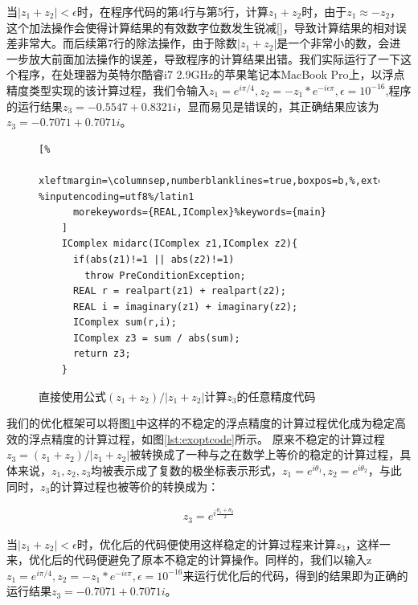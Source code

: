 当$|z_1+z_2| < \epsilon$时，在程序代码的第4行与第5行，计算$z_1+z_2$时，由于$z_1 \approx -z_2$，这个加法操作会使得计算结果的有效数字位数发生锐减[]，导致计算结果的相对误差非常大。而后续第7行的除法操作，由于除数$|z_1+z_2|$是一个非常小的数，会进一步放大前面加法操作的误差，导致程序的计算结果出错。我们实际运行了一下这个程序，在处理器为英特尔酷睿i7 2.9GHz的苹果笔记本MacBook Pro上，以浮点精度类型实现的该计算过程，我们令输入$z_1=e^{i\pi/4},z_2=-z_1*e^{-i \epsilon \pi},\epsilon=10^{-16}$,程序的运行结果$z_3=-0.5547+0.8321i$，显而易见是错误的，其正确结果应该为$z_3=-0.7071+0.7071i$。

\begin{figure}[thbp]
    \begin{lstlisting}[%
      xleftmargin=\columnsep,numberblanklines=true,boxpos=b,%,extendedchars=\true, %inputencoding=utf8%/latin1
      morekeywords={REAL,IComplex}%keywords={main}
    ]
    IComplex midarc(IComplex z1,IComplex z2){
      if(abs(z1)!=1 || abs(z2)!=1)
        throw PreConditionException;
      REAL r = realpart(z1) + realpart(z2);   
      REAL i = imaginary(z1) + imaginary(z2); 
      IComplex sum(r,i);
      IComplex z3 = sum / abs(sum);           
      return z3;
    }
    \end{lstlisting}
    \caption{直接使用公式$(z_1+z_2)/|z_1+z_2|$计算$z_3$的任意精度代码}
    \label{lst:exoricode}
\end{figure}
    
我们的优化框架可以将图\ref{lst:exoricode}中这样的不稳定的浮点精度的计算过程优化成为稳定高效的浮点精度的计算过程，如图\ref{lst:exoptcode}所示。 原来不稳定的计算过程$z_3=(z_1+z_2)/|z_1+z_2|$被转换成了一种与之在数学上等价的稳定的计算过程，具体来说，$z_1,z_2,z_3$均被表示成了复数的极坐标表示形式，$z_1=e^{i\theta_1},z_2=e^{i\theta_2}$，与此同时，$z_3$的计算过程也被等价的转换成为：

\begin{align}\label{eq:optex}
    z_3=e^{i\frac{\theta_1+\theta_2}{2}}
\end{align}

当$|z_1+z_2|<\epsilon$时，优化后的代码便使用这样稳定的计算过程来计算$z_3$，这样一来，优化后的代码便避免了原本不稳定的计算操作。同样的，我们以输入z$z_1=e^{i\pi/4},z_2=-z_1*e^{-i \epsilon \pi},\epsilon=10^{-16}$来运行优化后的代码，得到的结果即为正确的运行结果$z_3=-0.7071+0.7071i$。

